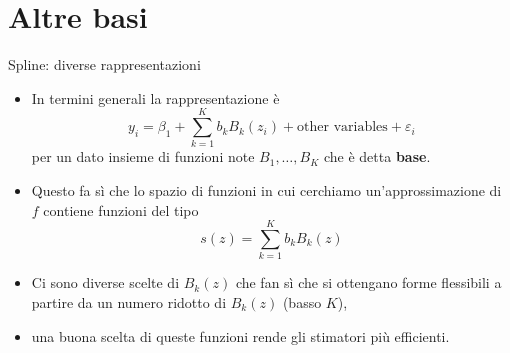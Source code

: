 \documentclass{beamer}\usepackage[]{graphicx}\usepackage[]{color}
\begin{document}
\section[Basi]{Altre basi}

\begin{frame}[allowframebreaks=0.95]{Spline: diverse rappresentazioni}
\begin{itemize}
\item
In termini generali la rappresentazione \`e
\[ y_i = \beta_1+\sum_{k=1}^K b_kB_k(z_i) + \mbox{other variables} + \varepsilon_i\]
per un dato insieme di funzioni note $B_1,\ldots,B_K$ che \`e detta {\bf base}. 
\item
Questo fa s\`i che lo spazio di funzioni in cui cerchiamo un'approssimazione di $f$ contiene funzioni del tipo
\[ s(z) = \sum_{k=1}^K b_kB_k(z) \]
\item Ci sono diverse scelte di $B_k(z)$ che fan s\`i che si ottengano forme flessibili a partire da un numero ridotto di $B_k(z)$ (basso $K$),
\item una buona scelta di queste funzioni rende gli stimatori pi\`u efficienti.
\end{itemize}

%
%
\end{frame}
\end{document}

